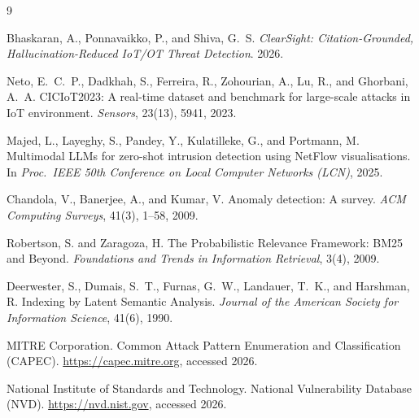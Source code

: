 \documentclass[11pt]{article}
\begin{document}
\begin{thebibliography}{9}

Bhaskaran, A., Ponnavaikko, P., and Shiva, G.\ S.
\textit{ClearSight: Citation-Grounded, Hallucination-Reduced IoT/OT Threat
Detection}. 2026.

Neto, E.~C.~P., Dadkhah, S., Ferreira, R., Zohourian, A., Lu, R., and
Ghorbani, A.~A.
CICIoT2023: A real-time dataset and benchmark for large-scale attacks in
IoT environment.
\textit{Sensors}, 23(13), 5941, 2023.

Majed, L., Layeghy, S., Pandey, Y., Kulatilleke, G., and Portmann, M.
Multimodal LLMs for zero-shot intrusion detection using NetFlow
visualisations.
In \textit{Proc.\ IEEE 50th Conference on Local Computer Networks (LCN)},
2025.

Chandola, V., Banerjee, A., and Kumar, V.
Anomaly detection: A survey.
\textit{ACM Computing Surveys}, 41(3), 1--58, 2009.

Robertson, S. and Zaragoza, H.
The Probabilistic Relevance Framework: BM25 and Beyond.
\textit{Foundations and Trends in Information Retrieval}, 3(4), 2009.

Deerwester, S., Dumais, S.\ T., Furnas, G.\ W., Landauer, T.\ K., and
Harshman, R.
Indexing by Latent Semantic Analysis.
\textit{Journal of the American Society for Information Science}, 41(6),
1990.

MITRE Corporation. Common Attack Pattern Enumeration and Classification
(CAPEC). \url{https://capec.mitre.org}, accessed 2026.

National Institute of Standards and Technology. National Vulnerability
Database (NVD). \url{https://nvd.nist.gov}, accessed 2026.

\end{thebibliography}
\end{document}
